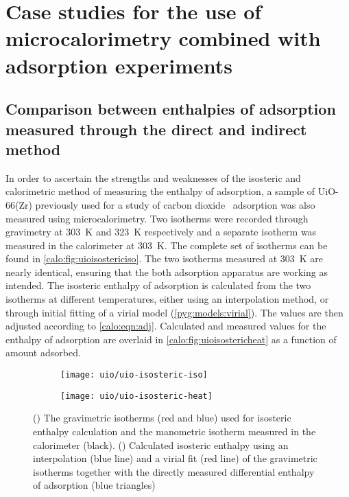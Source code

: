 
\section{Case studies for the use of 
microcalorimetry combined with adsorption experiments}

\subsection{Comparison between enthalpies of adsorption measured
	through the direct and indirect method}

In order to ascertain the strengths and weaknesses of the isosteric 
and calorimetric method of measuring the enthalpy of adsorption, 
a sample of UiO-66(Zr) previously used for a study of 
carbon dioxide~\cite{wiersumEvaluationUiO66GasBased2011} adsorption
was also measured using microcalorimetry.
Two isotherms were recorded through gravimetry at \SI{303}{\kelvin} and
\SI{323}{\kelvin} respectively and a separate isotherm was measured in the 
calorimeter at \SI{303}{\kelvin}. The complete set of isotherms can
be found in \autoref{calo:fig:uioisostericiso}.
The two isotherms measured at \SI{303}{\kelvin} are nearly identical, 
ensuring that the both adsorption apparatus are working as intended.
The isosteric enthalpy of adsorption is calculated from the two isotherms
at different temperatures, either using an interpolation method, or through
initial fitting of a virial model (\autoref{pyg:models:virial}).
The values are then adjusted according to \autoref{calo:eqn:adj}.
Calculated and measured values for the enthalpy of adsorption are overlaid
in \autoref{calo:fig:uioisostericheat} as a function of amount adsorbed.

\begin{figure}[htb]
	\centering

	\begin{subfigure}[b]{.5\textwidth}
		\centering
		\texttt{[image: uio/uio-isosteric-iso]}
		\caption{}%
		\label{calo:fig:uioisostericiso}
	\end{subfigure}%
	\begin{subfigure}[b]{.5\textwidth}
		\centering
		\texttt{[image: uio/uio-isosteric-heat]}
		\caption{}%
		\label{calo:fig:uioisostericheat}
	\end{subfigure}
	\caption{(\protect{})
		The gravimetric isotherms (red and blue) used for isosteric enthalpy
		calculation and the manometric isotherm measured in the calorimeter (black).
		(\protect{}) Calculated
		isosteric enthalpy using an interpolation (blue line) and a
		virial fit (red line) of the gravimetric isotherms together with
		the directly measured differential enthalpy of adsorption (blue triangles)}%
	\label{calo:fig:uioisosteric}

\end{figure}

